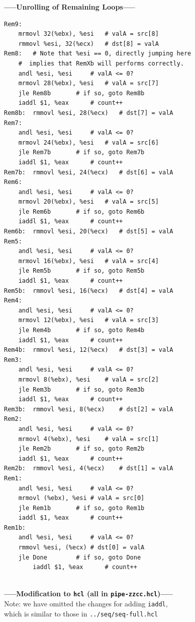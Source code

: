 \documentclass{article}
\begin{document}
\begin{center}
        \textbf{-----Unrolling of Remaining Loops-----}\\
\end{center}
\begin{lstlisting}
Rem9:
	mrmovl 32(%ebx), %esi	# valA = src[8]
	rmmovl %esi, 32(%ecx)	# dst[8] = valA
Rem8:	# Note that %esi == 0, directly jumping here
	#  implies that RemXb will performs correctly.
	andl %esi, %esi		# valA <= 0?
	mrmovl 28(%ebx), %esi	# valA = src[7]
	jle Rem8b		# if so, goto Rem8b
	iaddl $1, %eax		# count++
Rem8b:	rmmovl %esi, 28(%ecx)	# dst[7] = valA
Rem7:	
	andl %esi, %esi		# valA <= 0?
	mrmovl 24(%ebx), %esi	# valA = src[6]
	jle Rem7b		# if so, goto Rem7b
	iaddl $1, %eax		# count++
Rem7b:	rmmovl %esi, 24(%ecx)	# dst[6] = valA
Rem6:	
	andl %esi, %esi		# valA <= 0?
	mrmovl 20(%ebx), %esi	# valA = src[5]
	jle Rem6b		# if so, goto Rem6b
	iaddl $1, %eax		# count++
Rem6b:	rmmovl %esi, 20(%ecx)	# dst[5] = valA
Rem5:	
	andl %esi, %esi		# valA <= 0?
	mrmovl 16(%ebx), %esi	# valA = src[4]
	jle Rem5b		# if so, goto Rem5b
	iaddl $1, %eax		# count++
Rem5b:	rmmovl %esi, 16(%ecx)	# dst[4] = valA
Rem4:	
	andl %esi, %esi		# valA <= 0?
	mrmovl 12(%ebx), %esi	# valA = src[3]
	jle Rem4b		# if so, goto Rem4b
	iaddl $1, %eax		# count++
Rem4b:	rmmovl %esi, 12(%ecx)	# dst[3] = valA
Rem3:	
	andl %esi, %esi		# valA <= 0?
	mrmovl 8(%ebx), %esi	# valA = src[2]
	jle Rem3b		# if so, goto Rem3b
	iaddl $1, %eax		# count++
Rem3b:	rmmovl %esi, 8(%ecx)	# dst[2] = valA
Rem2:	
	andl %esi, %esi		# valA <= 0?
	mrmovl 4(%ebx), %esi	# valA = src[1]
	jle Rem2b		# if so, goto Rem2b
	iaddl $1, %eax		# count++
Rem2b:	rmmovl %esi, 4(%ecx)	# dst[1] = valA
Rem1:	
	andl %esi, %esi		# valA <= 0?
	mrmovl (%ebx), %esi	# valA = src[0]
	jle Rem1b		# if so, goto Rem1b
	iaddl $1, %eax		# count++
Rem1b:	
	andl %esi, %esi		# valA <= 0?
	rmmovl %esi, (%ecx)	# dst[0] = valA
	jle Done		# if so, goto Done
        iaddl $1, %eax		# count++
        
\end{lstlisting}
\pagebreak
\begin{center}
        \textbf{-----Modification to \texttt{hcl} (all in \texttt{pipe-zzcc.hcl})-----}\\
        Note: we have omitted the changes for adding \texttt{iaddl}, \\which is similar to those in \texttt{../seq/seq-full.hcl}
\end{center}
\end{document}
